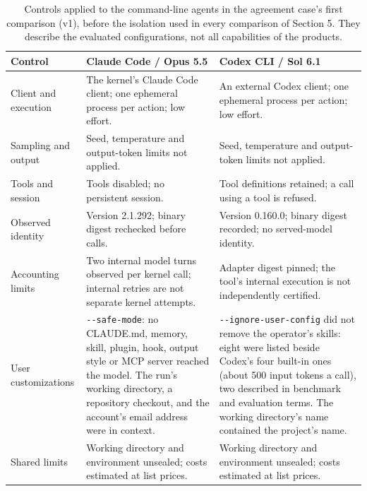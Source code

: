 \renewcommand{\thetable}{H.1}
\begin{longtable}{@{}P{1.25in}P{2.6in}P{2.6in}@{}}
\caption{Controls applied to the command-line agents in the agreement case's first comparison (v1), before the
isolation used in every comparison of Section 5. They describe the evaluated configurations, not all capabilities
of the products.}
\label{tab:cli-controls}\\
\toprule
\textbf{Control} & \textbf{Claude Code / Opus 5.5} & \textbf{Codex CLI / Sol 6.1}\\
\midrule\endfirsthead
\endhead\endfoot\endlastfoot
Client and execution & The kernel's Claude Code client; one ephemeral process per action; low effort. & An external Codex client; one ephemeral process per action; low effort.\\
Sampling and output & Seed, temperature and output-token limits not applied. & Seed, temperature and output-token limits not applied.\\
Tools and session & Tools disabled; no persistent session. & Tool definitions retained; a call using a tool is refused.\\
Observed identity & Version 2.1.292; binary digest rechecked before calls. & Version 0.160.0; binary digest recorded; no served-model identity.\\
Accounting limits & Two internal model turns observed per kernel call; internal retries are not separate kernel attempts. & Adapter digest pinned; the tool's internal execution is not independently certified.\\
User customizations & \verb|--safe-mode|: no CLAUDE.md, memory, skill, plugin, hook, output style or MCP server reached the model. The run's working directory, a repository checkout, and the account's email address were in context. & \verb|--ignore-user-config| did not remove the operator's skills: eight were listed beside Codex's four built-in ones (about 500 input tokens a call), two described in benchmark and evaluation terms. The working directory's name contained the project's name.\\
Shared limits & Working directory and environment unsealed; costs estimated at list prices. & Working directory and environment unsealed; costs estimated at list prices.\\
\end{longtable}
